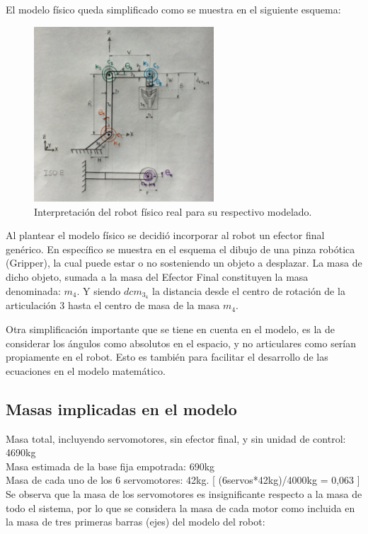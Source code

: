 \documentclass{aleph-revista}
\begin{document}
El modelo físico queda simplificado como se muestra en el siguiente esquema:

\begin{figure}[H]
    \centering
    \includegraphics[width=0.60\textwidth]{Imagenes/modelo.jpg}
    \caption{Interpretación del robot físico real para su respectivo modelado.}
    \label{fig:etiqueta de la figura}
\end{figure}

Al plantear el modelo físico se decidió incorporar al robot un efector final genérico. En específico se muestra en el esquema el dibujo de una pinza robótica (Gripper), la cual puede estar o no sosteniendo un objeto a desplazar. La masa de dicho objeto, sumada a la masa del Efector Final constituyen la masa denominada: $m_4$.
Y siendo $dcm_3_4$ la distancia desde el centro de rotación de la articulación 3 hasta el centro de masa de la masa $m_4$.


Otra simplificación importante que se tiene en cuenta en el modelo, es la de considerar los ángulos como absolutos en el espacio, y no articulares como serían propiamente en el robot. Esto es también para facilitar el desarrollo de las ecuaciones en el modelo matemático.


\subsection{Masas implicadas en el modelo}

Masa total, incluyendo servomotores, sin efector final, y sin unidad de control: 4690kg\\
Masa estimada de la base fija empotrada: 690kg \\
Masa de cada uno de los 6 servomotores: 42kg.
[ (6servos*42kg)/4000kg = 0,063 ]  
 \\Se observa que la masa de los servomotores es insignificante respecto a la masa de todo el sistema, por lo que se considera la masa de cada motor como incluida en la masa de  tres primeras barras (ejes) del modelo del robot:\\
\end{document}
